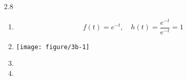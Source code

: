 \documentclass[12pt]{article}\usepackage[]{graphicx}\usepackage[]{color}
\newenvironment{knitrout}{}{} %
\begin{document}
\begin{enumerate}
\item[2.8]
\begin{enumerate}
  \item
  \[f(t) = e^{-t},\quad h(t) = \frac{e^{-t}}{e^{-t}}=1\]
  \item
\begin{knitrout}
\color{fgcolor}
\texttt{[image: figure/3b-1]} 

\end{knitrout}
  \item
  \item
\end{enumerate}
\end{enumerate}
\end{document}
